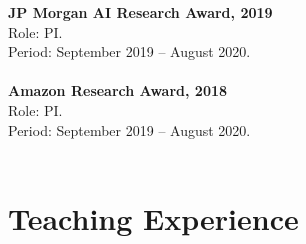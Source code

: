 \documentclass[Times]{article}
\newcommand{\funding}[1]{#1\\}
\renewcommand{\funding}[1]{\\}
\begin{document}
\textbf{JP Morgan AI Research Award, 2019}\\
Role: PI.\\
Period: September 2019 -- August 2020.\\
\funding{Amount: \$147,424.}

\textbf{Amazon Research Award, 2018}\\
Role: PI.\\
Period: September 2019 -- August 2020.\\
\funding{Amount: \$80,000.}









\section*{Teaching Experience}
\end{document}
